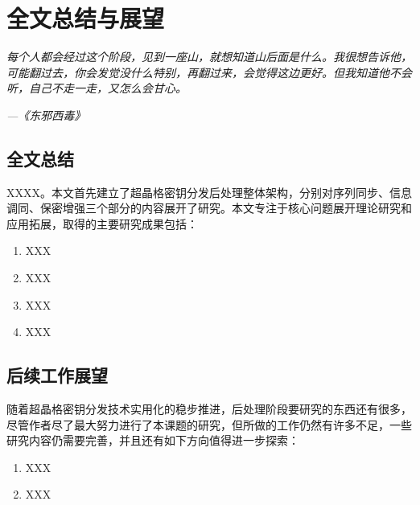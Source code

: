 \chapter{全文总结与展望}
\label{ch7}

\emph{\kaishu 每个人都会经过这个阶段，见到一座山，就想知道山后面是什么。我很想告诉他，可能翻过去，你会发觉没什么特别，再翻过来，会觉得这边更好。但我知道他不会听，自己不走一走，又怎么会甘心。}

\emph{\kaishu \hfill ---《东邪西毒》}\\

\section{全文总结}

XXXX。本文首先建立了超晶格密钥分发后处理整体架构，分别对序列同步、信息调同、保密增强三个部分的内容展开了研究。本文专注于核心问题展开理论研究和应用拓展，取得的主要研究成果包括：

\begin{enumerate}[(1)]
	\item XXX
	\item XXX
	\item XXX
	\item XXX
\end{enumerate}



\section{后续工作展望}
随着超晶格密钥分发技术实用化的稳步推进，后处理阶段要研究的东西还有很多，尽管作者尽了最大努力进行了本课题的研究，但所做的工作仍然有许多不足，一些研究内容仍需要完善，并且还有如下方向值得进一步探索：

\begin{enumerate}[(1)]
	\item XXX
	\item XXX
\end{enumerate}
